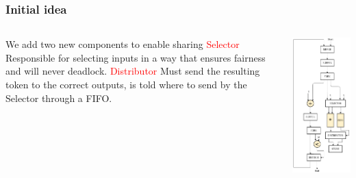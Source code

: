 \documentclass{beamer}
\renewcommand{\emph}{\textcolor{red}}
\begin{document}
\begin{frame}[fragile]
\frametitle{Initial idea}
\begin{columns}[T]
    \begin{column}{0.45\textwidth}
    We add two new components to enable sharing \newline \newline
    \emph{Selector} \newline
    Responsible for selecting inputs in a way that ensures fairness and will never deadlock. 
    \newline 
    \newline
    \emph{Distributor} \newline
    Must send the resulting token to the correct outputs, is told where to send by the Selector through a FIFO.
    \end{column}
    \begin{column}{0.45\textwidth}
        \begin{center}
      \includegraphics[scale=0.25]{shared_base_case.png}
    \end{center}
    \end{column}
  \end{columns}
\end{frame}
\end{document}
